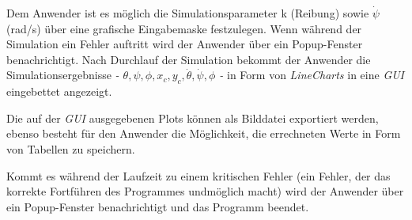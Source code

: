 {Dem Anwender ist es möglich die Simulationsparameter k (Reibung) sowie 
$ \dot \psi $ (rad/s) \"uber eine grafische Eingabemaske festzulegen. 
Wenn w\"ahrend der Simulation ein Fehler auftritt wird der Anwender 
\"uber ein Popup-Fenster benachrichtigt. Nach Durchlauf der Simulation
bekommt der Anwender die Simulationsergebnisse 
\textit{ - $\theta, \psi, \phi, x_c, y_c, \dot \theta, \dot \psi, 
\phi$ -} in Form von \textit{LineCharts} in eine \textit{GUI} 
eingebettet angezeigt. 

Die auf der \textit{GUI} ausgegebenen Plots k\"onnen als Bilddatei exportiert werden, ebenso besteht f\"ur den Anwender die M\"oglichkeit, die errechneten Werte in Form von Tabellen zu speichern. \medskip

Kommt es w\"ahrend der Laufzeit zu einem kritischen Fehler (ein Fehler, der das korrekte Fortf\"uhren des Programmes undm\"oglich macht) wird der Anwender \"uber ein Popup-Fenster benachrichtigt und das Programm beendet.
\medskip


 }







